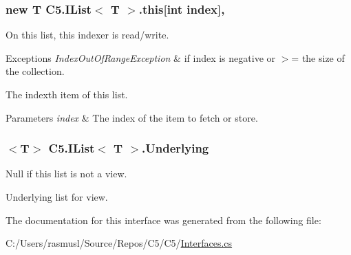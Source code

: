 \subsubsection[{this[int index]}]{\setlength{\rightskip}{0pt plus 5cm}new T {\bf C5.\+I\+List}$<$ T $>$.this\mbox{[}int index\mbox{]}\hspace{0.3cm}{\ttfamily [get]}, {\ttfamily [set]}}\label{interface_c5_1_1_i_list_a93fa9e99864a05d47bcc6a5e4bf7feb9}


On this list, this indexer is read/write. 


\begin{DoxyExceptions}{Exceptions}
{\em Index\+Out\+Of\+Range\+Exception} & if index is negative or $>$= the size of the collection.\\
\hline
\end{DoxyExceptions}


The index\textquotesingle{}th item of this list.


\begin{DoxyParams}{Parameters}
{\em index} & The index of the item to fetch or store.\\
\hline
\end{DoxyParams}
\hypertarget{interface_c5_1_1_i_list_a2cdfa7ff17c18708340c56ae79f290bb}{}
\subsubsection[{Underlying}]{$<$T$>$ {\bf C5.\+I\+List}$<$ T $>$.Underlying\hspace{0.3cm}{\ttfamily [get]}}\label{interface_c5_1_1_i_list_a2cdfa7ff17c18708340c56ae79f290bb}


Null if this list is not a view. 

Underlying list for view.

The documentation for this interface was generated from the following file\+:\begin{DoxyCompactItemize}
\item 
C\+:/\+Users/rasmusl/\+Source/\+Repos/\+C5/\+C5/\hyperlink{_interfaces_8cs}{Interfaces.\+cs}\end{DoxyCompactItemize}
